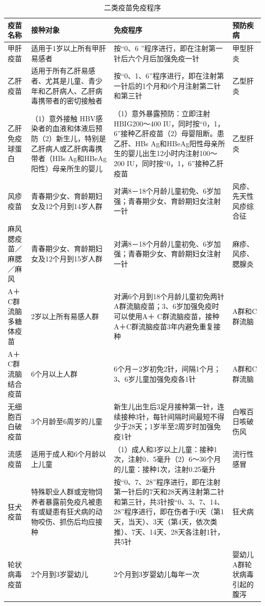 \begin{longtable}[]{p{3cm}p{4cm}p{4cm}p{4cm}}
    \caption{二类疫苗免疫程序}
    \label{tab11-2}\\
\toprule
疫苗名称 & 接种对象 & 免疫程序 & 预防疾病
\tabularnewline
\midrule
\endhead
甲肝疫苗 & 适用于1岁以上所有甲肝易感者 & 按“0、6 ”程序进行，即在注射第一针后六个月后加强免疫一针 & 甲型肝炎\\
乙肝疫苗 & 适用于所有乙肝易感者、尤其是儿童、青少年和乙肝病人、乙肝病毒携带者的密切接触者 & 按“0、1、6”程序进行，即在注射第一针后的1个月和6个月注射第二针和第三针 & 乙型肝炎\\
乙肝免疫球蛋白& （1）意外接触 HBV感染者的血液和体液后预防（2）新生儿，特别是乙肝病人或乙肝病毒携带者（HBs Ag和HBeAg阳性）母亲所生的婴儿 & （1）意外暴露预防：立即注射 HBIG200～400 IU，同时按“0，1，6”接种乙肝疫苗（2）母婴阻断。患乙肝、HBs Ag和HBeAg阳性母亲所生的婴儿出生12小时内注射100～200 IU，同时按“0，1，6”接种乙肝疫苗& 乙型肝炎\\
风疹疫苗& 青春期少女、育龄期妇女及12个月到14岁人群 & 对满8－18个月龄儿童初免、6岁加强；青春期少女、育龄期妇女注射一针 & 风疹、先天性风疹综合征\\
麻风腮疫苗／麻腮／麻风 & 青春期少女、育龄期妇女及12个月到15岁人群 & 对满8－18个月龄儿童初免、6岁加强；青春期少女、育龄期妇女注射一针 & 麻疹、风疹、腮腺炎\\
A＋ C群流脑多糖体疫苗& 2岁以上所有易感人群& 对满6个月到18个月龄儿童初免两针 A群流脑疫苗；3、6岁加强免疫时可以使用A＋ C群流脑疫苗，接种 A＋C群流脑疫苗3年内避免重复接种& A群和C群流脑\\
A＋C群流脑结合疫苗 & 6个月以上人群 & 6个月－2岁初免2针，间隔1个月；3、6岁儿童加强免疫各1针 & A群和C群流脑\\
无细胞百白破疫苗 & 3个月龄至6周岁的儿童 &新生儿出生后3足月接种第一针，连续接种3针，每针间隔时间最短不得少于28天；1岁半至2周岁时加强免疫1针& 白喉百日咳破伤风\\
流感疫苗 & 适用于成人和6个月龄以上儿童 &（1）成人和3岁以上儿童：接种1次，注射0．5毫升（2）6～36个月的儿童：接种1次，注射0.25毫升& 流行性感冒\\
狂犬疫苗 &特殊职业人群或宠物饲养者暴露前免疫凡被患有或疑患有狂犬病的动物咬伤、抓伤后均应接种& 按“0、7、28”程序进行，即在注射第一针后的7天和28天再注射第二针和第三针，共3针按“0、3、7、14、28”程序进行，即在伤者于0天（第1天，当天）、3天（第4天，依次类推）、7天、14天、28天各注射1针，共5针& 狂犬病\\
轮状病毒疫苗 & 2个月到3岁婴幼儿 & 2个月到3岁婴幼儿每年一次 & 婴幼儿A群轮状病毒引起的腹泻\\

\end{longtable}
